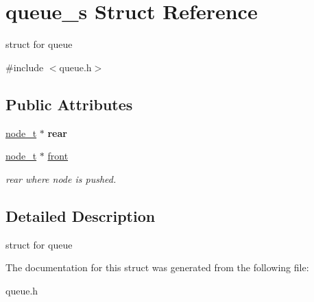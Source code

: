 \hypertarget{structqueue__s}{\section{queue\-\_\-s Struct Reference}
\label{structqueue__s}
}


struct for queue  




{\ttfamily \#include $<$queue.\-h$>$}

\subsection*{Public Attributes}
\begin{DoxyCompactItemize}
\item 
\hypertarget{structqueue__s_a5d76357b63fe27ded318b721be63f1a3}{\hyperlink{structnode__s}{node\-\_\-t} $\ast$ {\bfseries rear}}\label{structqueue__s_a5d76357b63fe27ded318b721be63f1a3}

\item 
\hypertarget{structqueue__s_acea675d80d267dea0c72a9aa9ac09658}{\hyperlink{structnode__s}{node\-\_\-t} $\ast$ \hyperlink{structqueue__s_acea675d80d267dea0c72a9aa9ac09658}{front}}\label{structqueue__s_acea675d80d267dea0c72a9aa9ac09658}

\begin{DoxyCompactList}\small\item\em rear where node is pushed. \end{DoxyCompactList}\end{DoxyCompactItemize}


\subsection{Detailed Description}
struct for queue 

The documentation for this struct was generated from the following file\-:\begin{DoxyCompactItemize}
\item 
queue.\-h\end{DoxyCompactItemize}
